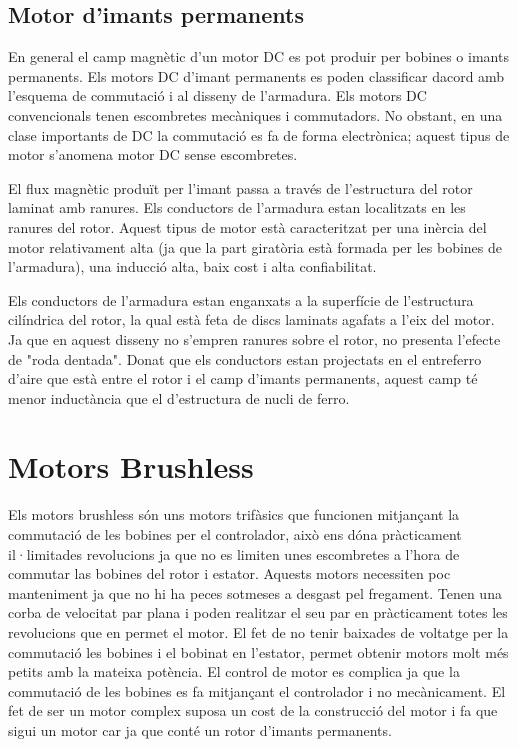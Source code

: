 \subsection{Motor d'imants permanents}
En general el camp magnètic d'un motor DC es pot produir per bobines o imants permanents. Els motors DC d'imant permanents es poden classificar dacord amb l'esquema de commutació i al disseny de l'armadura. Els motors DC convencionals tenen escombretes mecàniques i commutadors. No obstant, en una clase importants de DC la commutació es fa de forma electrònica; aquest tipus de motor s'anomena motor DC sense escombretes.

El flux magnètic produït per l'imant passa a través de l'estructura del rotor laminat amb ranures. Els conductors de l'armadura estan localitzats en les ranures del rotor. Aquest tipus de motor està caracteritzat per una inèrcia del motor relativament alta (ja que la part giratòria està formada per les bobines de l'armadura), una inducció alta, baix cost i alta confiabilitat.

Els conductors de l'armadura estan enganxats a la superfície de \newline l'estructura cilíndrica del rotor, la qual està feta de discs laminats agafats a l'eix del motor. Ja que en aquest disseny no s'empren ranures sobre el rotor, no presenta l'efecte de "roda dentada". Donat que els conductors estan projectats en el entreferro d'aire que està entre el rotor i el camp d'imants permanents, aquest camp té menor inductància que el d'estructura de nucli de ferro.

\section{Motors Brushless}
Els motors brushless són uns motors trifàsics que funcionen mitjançant la commutació de les bobines per el controlador, això ens dóna pràcticament il·limitades revolucions ja que no es limiten unes escombretes a l'hora de commutar las bobines del rotor i estator. Aquests motors necessiten poc manteniment ja que no hi ha peces sotmeses a desgast pel fregament. Tenen una corba de velocitat par plana i poden realitzar el seu par en pràcticament totes les revolucions que en permet el motor. El fet de no tenir baixades de voltatge per la commutació les bobines i el bobinat en l'estator, permet obtenir motors molt més petits amb la mateixa potència. El control de motor es complica ja que la commutació de les bobines es fa mitjançant el controlador i no mecànicament. El fet de ser un motor complex suposa un cost de la construcció del motor i fa que sigui un motor car ja que conté un rotor d'imants permanents.

